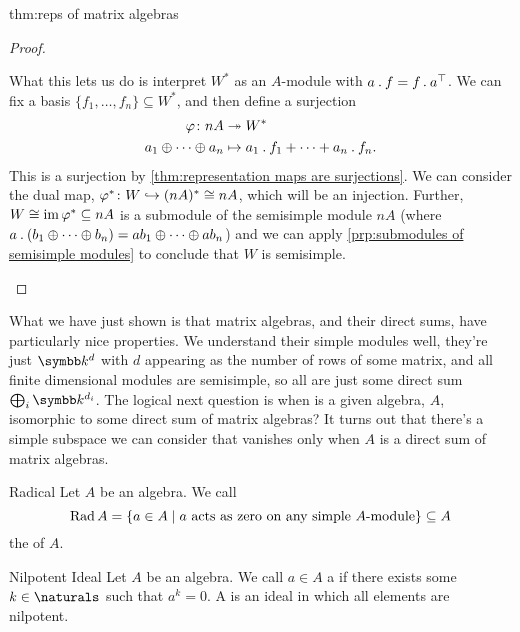 \begin{thm}{}{thm:reps of matrix algebras}
\begin{proof}
\begin{enumerate}
            What this lets us do is interpret \(W^*\) as an \(A\)-module with \(a \mathbin{.} f = f \mathbin{.} a^{\top}\).
            We can fix a basis \(\{f_1, \dotsc, f_n\} \subseteq W^*\), and then define a surjection
            \begin{align}
                \varphi \colon nA &\twoheadrightarrow W^*\\
                a_1 \oplus \dotsb \oplus a_n &\mapsto a_1 \mathbin{.} f_1 + \dotsb + a_n \mathbin{.} f_n.
            \end{align}
            This is a surjection by \cref{thm:representation maps are surjections}.
            We can consider the dual map, \(\varphi^* \colon W \hookrightarrow (nA)^* \cong nA\), which will be an injection.
            Further, \(W \cong \operatorname{im} \varphi^* \subseteq nA\) is a submodule of the semisimple module \(nA\) (where \(a \mathbin{.} (b_1 \oplus \dotsb \oplus b_n) = ab_1 \oplus \dotsb \oplus ab_n\)) and we can apply \cref{prp:submodules of semisimple modules} to conclude that \(W\) is semisimple.
        \end{enumerate}
    \end{proof}
\end{thm}

What we have just shown is that matrix algebras, and their direct sums, have particularly nice properties.
We understand their simple modules well, they're just \(\field^{d}\) with \(d\) appearing as the number of rows of some matrix, and all finite dimensional modules are semisimple, so all are just some direct sum \(\bigoplus_i \field^{d_i}\).
The logical next question is when is a given algebra, \(A\), isomorphic to some direct sum of matrix algebras?
It turns out that there's a simple subspace we can consider that vanishes only when \(A\) is a direct sum of matrix algebras.

\begin{dfn}{Radical}{}
    Let \(A\) be an algebra.
    We call
    \begin{equation}
        \operatorname{Rad} A = \{a \in A \mid a \text{ acts as zero on any simple } A \text{-module}\} \subseteq A
    \end{equation}
    the  of \(A\).
\end{dfn}

\begin{dfn}{Nilpotent Ideal}{}
    Let \(A\) be an algebra.
    We call \(a \in A\) a  if there exists some \(k \in \naturals\) such that \(a^k = 0\).
    A  is an ideal in which all elements are nilpotent.
\end{dfn}

